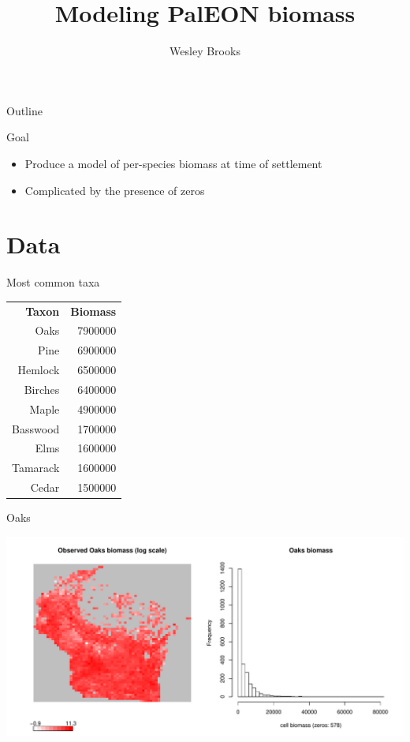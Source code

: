 \documentclass{beamer}
\author{Wesley Brooks}
\title{Modeling PalEON biomass}
\institute{UW-Madison}
\begin{document}
\begin{frame}
  \titlepage
\end{frame}


\begin{frame}{Outline}
  \tableofcontents
\end{frame}


\begin{frame}{Goal}
  \begin{itemize}
    \item Produce a model of per-species biomass at time of settlement
    \item Complicated by the presence of zeros
  \end{itemize}
\end{frame}

\section{Data}

\begin{frame}{Most common taxa}
	\begin{table}[ht]
	\begin{center}
	\begin{tabular}{rr}
	  \textbf{Taxon} & \textbf{Biomass} \\
	  \rowcolor[gray]{0.9}Oaks & 7900000 \\ 
	  Pine & 6900000 \\ 
	  Hemlock & 6500000 \\ 
	  Birches & 6400000 \\ 
	  \rowcolor[gray]{0.9}Maple & 4900000 \\ 
	  Basswood & 1700000 \\ 
	  Elms & 1600000 \\ 
	  Tamarack & 1600000 \\ 
	  Cedar & 1500000 \\ 
	\end{tabular}
	\end{center}
	\end{table}
\end{frame}

\begin{frame}{Oaks}
\begin{center}
  \includegraphics[width=\textwidth]{../../figures/raw/Oaks-observed-heatmap.pdf}
\end{center}
\end{frame}
\end{document}
